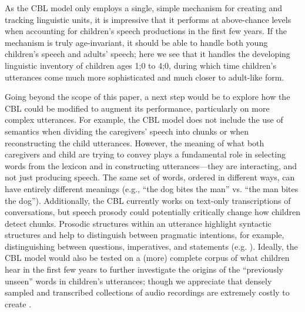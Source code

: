 \documentclass{article}
\begin{document}
As the CBL model only employs a single, simple mechanism for creating and tracking linguistic units, it is impressive that it performs at above-chance levels when accounting for children's speech productions in the first few years. If the mechanism is truly age-invariant, it should be able to handle both young children's speech and adults' speech; here we see that it handles the developing linguistic inventory of children ages 1;0 to 4;0, during which time children's utterances come much more sophisticated and much closer to adult-like form.

Going beyond the scope of this paper, a next step would be to explore how the CBL could be modified to augment its performance, particularly on more complex utterances. For example, the CBL model does not include the use of semantics when dividing the caregivers' speech into chunks or when reconstructing the child utterances. However, the meaning of what both caregivers and child are trying to convey plays a fundamental role in selecting words from the lexicon and in constructing utterances---they are interacting, and not just producing speech. The same set of words, ordered in different ways, can have entirely different meanings (e.g., ``the dog bites the man'' vs. ``the man bites the dog''). Additionally, the CBL currently works on text-only transcriptions of conversations, but speech prosody could potentially critically change how children detect chunks. Prosodic structures within an utterance highlight syntactic structures and help to distinguish between pragmatic intentions, for example, distinguishing between questions, imperatives, and statements (e.g. ). Ideally, the CBL model would also be tested on a (more) complete corpus of what children hear in the first few years to further investigate the origins of the ``previously unseen'' words in children's utterances; though we appreciate that densely sampled and transcribed collections of audio recordings are extremely costly to create \cite{casillasURstep, roy2009exploring}.
\end{document}
